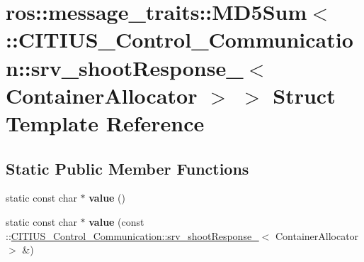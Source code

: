 \hypertarget{structros_1_1message__traits_1_1_m_d5_sum_3_01_1_1_c_i_t_i_u_s___control___communication_1_1srv_1914a976d2e8dbfc40b7a1c43c6d646f}{\section{ros\-:\-:message\-\_\-traits\-:\-:\-M\-D5\-Sum$<$ \-:\-:\-C\-I\-T\-I\-U\-S\-\_\-\-Control\-\_\-\-Communication\-:\-:srv\-\_\-shoot\-Response\-\_\-$<$ \-Container\-Allocator $>$ $>$ \-Struct \-Template \-Reference}
\label{structros_1_1message__traits_1_1_m_d5_sum_3_01_1_1_c_i_t_i_u_s___control___communication_1_1srv_1914a976d2e8dbfc40b7a1c43c6d646f}
}
\subsection*{\-Static \-Public \-Member \-Functions}
\begin{DoxyCompactItemize}
\item 
\hypertarget{structros_1_1message__traits_1_1_m_d5_sum_3_01_1_1_c_i_t_i_u_s___control___communication_1_1srv_1914a976d2e8dbfc40b7a1c43c6d646f_a11bcd88b16ece0af82bfa0ba9dbeb5ec}{static const char $\ast$ {\bfseries value} ()}\label{structros_1_1message__traits_1_1_m_d5_sum_3_01_1_1_c_i_t_i_u_s___control___communication_1_1srv_1914a976d2e8dbfc40b7a1c43c6d646f_a11bcd88b16ece0af82bfa0ba9dbeb5ec}

\item 
\hypertarget{structros_1_1message__traits_1_1_m_d5_sum_3_01_1_1_c_i_t_i_u_s___control___communication_1_1srv_1914a976d2e8dbfc40b7a1c43c6d646f_ac1ecaef8d7a87bc6565d5f8b19f0ce21}{static const char $\ast$ {\bfseries value} (const \-::\hyperlink{struct_c_i_t_i_u_s___control___communication_1_1srv__shoot_response__}{\-C\-I\-T\-I\-U\-S\-\_\-\-Control\-\_\-\-Communication\-::srv\-\_\-shoot\-Response\-\_\-}$<$ \-Container\-Allocator $>$ \&)}\label{structros_1_1message__traits_1_1_m_d5_sum_3_01_1_1_c_i_t_i_u_s___control___communication_1_1srv_1914a976d2e8dbfc40b7a1c43c6d646f_ac1ecaef8d7a87bc6565d5f8b19f0ce21}

\end{DoxyCompactItemize}
